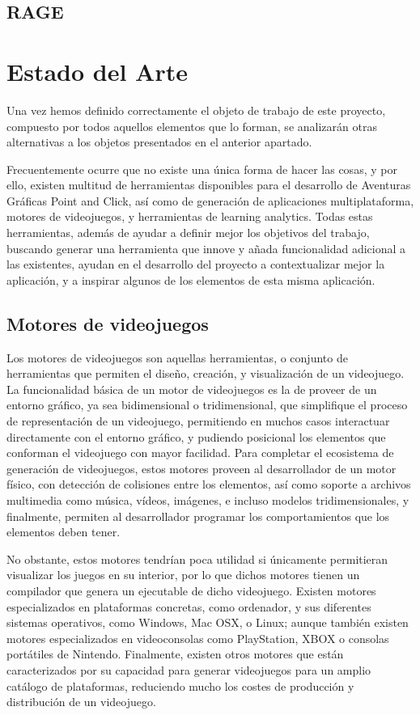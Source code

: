\subsection{RAGE}
\label{rage}

\section{Estado del Arte}
\label{estadodelarte}

Una vez hemos definido correctamente el objeto de trabajo de este proyecto, compuesto por todos aquellos elementos que lo forman, se analizarán otras alternativas a los objetos presentados en el anterior apartado. 

Frecuentemente ocurre que no existe una única forma de hacer las cosas, y por ello, existen multitud de herramientas disponibles para el desarrollo de Aventuras Gráficas Point and Click, así como de generación de aplicaciones multiplataforma, motores de videojuegos, y herramientas de learning analytics. Todas estas herramientas, además de ayudar a definir mejor los objetivos del trabajo, buscando generar una herramienta que innove y añada funcionalidad adicional a las existentes, ayudan en el desarrollo del proyecto a contextualizar mejor la aplicación, y a inspirar algunos de los elementos de esta misma aplicación.

\subsection{Motores de videojuegos}
\label{motoresdevideojuegos}

Los motores de videojuegos son aquellas herramientas, o conjunto de herramientas que permiten el diseño, creación, y visualización de un videojuego. La funcionalidad básica de un motor de videojuegos es la de proveer de un entorno gráfico, ya sea bidimensional o tridimensional, que simplifique el proceso de representación de un videojuego, permitiendo en muchos casos interactuar directamente con el entorno gráfico, y pudiendo posicional los elementos que conforman el videojuego con mayor facilidad. Para completar el ecosistema de generación de videojuegos, estos motores proveen al desarrollador de un motor físico, con detección de colisiones entre los elementos, así como soporte a archivos multimedia como música, vídeos, imágenes, e incluso modelos tridimensionales, y finalmente, permiten al desarrollador programar los comportamientos que los elementos deben tener.

No obstante, estos motores tendrían poca utilidad si únicamente permitieran visualizar los juegos en su interior, por lo que dichos motores tienen un compilador que genera un ejecutable de dicho videojuego. Existen motores especializados en plataformas concretas, como ordenador, y sus diferentes sistemas operativos, como Windows, Mac OSX, o Linux; aunque también existen motores especializados en videoconsolas como PlayStation, XBOX o consolas portátiles de Nintendo. Finalmente, existen otros motores que están caracterizados por su capacidad para generar videojuegos para un amplio catálogo de plataformas, reduciendo mucho los costes de producción y distribución de un videojuego.

